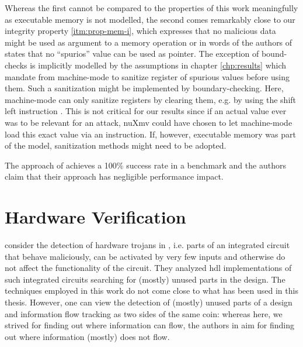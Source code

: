 Whereas the first cannot be compared to the properties of this work meaningfully as executable memory is not modelled, the second comes remarkably close to our integrity property \ref{itm:prop-mem-i}, which expresses that no malicious data might be used as argument to a memory operation or in words of the authors of \cite{SuhLZD04} states that no \enquote{spurios} value can be used as pointer.
The exception of bound-checks is implicitly modelled by the  assumptions in chapter \ref{chp:results} which mandate from machine-mode to sanitize register of spurious values before using them.
Such a sanitization might be implemented by boundary-checking.
Here, machine-mode can only sanitize registers by clearing them, e.g. by using the shift left instruction .
This is not critical for our results since if an actual value ever was to be relevant for an attack, nuXmv could have chosen to let machine-mode load this exact value via an  instruction.
If, however, executable memory was part of the model, sanitization methods might need to be adopted.

The approach of \cite{SuhLZD04} achieves a 100\% success rate in a benchmark and the authors claim that their approach has negligible performance impact.

\section{Hardware Verification}

\citeauthor{Zhang15} consider the detection of hardware trojans in  \cite{Zhang15}, i.e. parts of an integrated circuit that behave maliciously, can be activated by very few inputs and otherwise do not affect the functionality of the circuit.
They analyzed \gls{hdl} implementations of such integrated circuits searching for (mostly) unused parts in the design.
The techniques employed in this work do not come close to what has been used in this thesis.
However, one can view the detection of (mostly) unused parts of a design and information flow tracking as two sides of the same coin: whereas here, we strived for finding out where information can flow, the authors in \cite{Zhang15} aim for finding out where information (mostly) does not flow.

